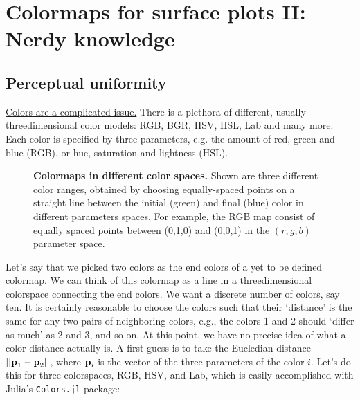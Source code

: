 \section{Colormaps for surface plots II: Nerdy knowledge}
\subsection{Perceptual uniformity}\label{sec:perceptualuniform}
\href{https://xkcd.com/1882/}{Colors are a complicated issue.} There is a plethora of different, usually threedimensional color models: RGB, BGR, HSV, HSL, Lab and many more. Each color is specified by three parameters, e.g. the amount of red, green and blue (RGB), or hue, saturation and lightness (HSL).   

\begin{figure}
\captionsetup{format = sidebyside, indention = 0cm} 
\begin{minipage}[t]{0.4\textwidth}
	\vspace{-5pt}
	\caption{\textbf{Colormaps in different color spaces.} Shown are three different color ranges, obtained by choosing equally-spaced points on a straight line between the initial (green) and final (blue) color in different parameters spaces. For example, the RGB map consist of equally spaced points between (0,1,0) and (0,0,1) in the $(r,g,b)$ parameter space.}
	\label{fig:colorspaces}
\end{minipage}\hfill 
\begin{minipage}[t]{0.55\textwidth}
	\centering 
	\vspace{0pt}
	
\end{minipage}
\end{figure} 

Let's say that we picked two colors as the end colors of a yet to be defined colormap. We can think of this colormap as a line in a threedimensional colorspace connecting the end colors. We want a discrete number of colors, say ten. It is certainly reasonable to choose the colors such that their `distance' is the same for any two pairs of neighboring colors, e.g., the colors 1 and 2 should `differ as much' as 2 and 3, and so on. At this point, we have no precise idea of what a color distance actually is. A first guess is to take the Eucledian distance $||\textbf{p}_1-\textbf{p}_2||$, where $\textbf{p}_i$ is the vector of the three parameters of the color $i$.  Let's do this for three colorspaces, RGB, HSV, and Lab, which is easily accomplished with Julia's \verb|Colors.jl| package:

